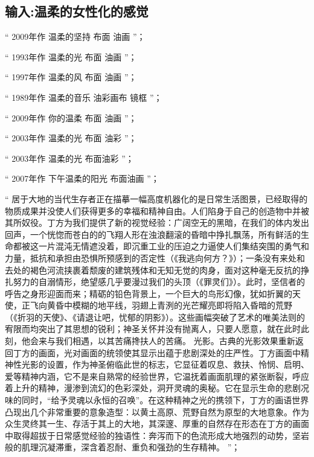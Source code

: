 \documentclass[master,oneside]{zjuthesis}
\begin{document}
\subsection{输入:温柔的女性化的感觉}
“ 2009年作 温柔的坚持 布面 油画 ”；

“ 1993年作 温柔的光 布面 油画 ”；

“ 1997年作 温柔的风 布面 油画 ”；

“ 1989年作 温柔的音乐 油彩画布 镜框 ”；

“ 2009年作 你的温柔 布面 油画 ”；

“ 2003年作 温柔的光 布面 油彩 ”；

“ 2003年作 温柔的光 布面油彩 ”；

“ 2007年作 下午温柔的阳光 布面油画 ”；

“ 居于大地的当代生存者正在描摹一幅高度机器化的是日常生活图景，已经取得的物质成果并没使人们获得更多的幸福和精神自由。人们陷身于自己的创造物中并被其所奴役。丁方为我们提供了新的视觉经验：广阔空无的黑暗，在我们的体内发出回声，一个恍惚而苍白的的飞翔人形在浊浪翻滚的昏暗中挣扎飘荡，所有鲜活的生命都被这一片混沌无情遮没着，即沉重工业的压迫之力逼使人们集结突围的勇气和力量，抵抗和承担由恐惧所预感到的否定性（《我逃向何方？》）；一条没有来处和去处的褐色河流挟裹着颓废的建筑残体和无知无觉的肉身，面对这种毫无反抗的挣扎努力的自溺情形，绝望感几乎要漫过我们的头顶（《罪灵们》）。此时，坚信者的呼告之身形迎面而来；精砺的铅色背景上，一个巨大的鸟形幻像，犹如折翼的天使，正飞向黄昏中模糊的地平线，羽翅上青洌的光芒耀亮即将陷入昏暗的荒野（《折羽的天使》、《请退让吧，忧郁的阴影》）。这些画幅突破了艺术的唯美法则的宥限而均突出了其思想的锐利；神圣关怀并没有抛离人，只要人愿意，就在此时此刻，他会来与我们相遇，以其苦痛搀扶人的苦痛。 光影。古典的光影效果重新返回丁方的画面，光对画面的统领使其显示出蕴于悲剧深处的庄严性。丁方画面中精神性光影的设置，作为神圣俯临此世的标志，它显征着叹息、救扶、怜悯、启明、爱等精神内涵，它不是来自熟常的经验世界，它温抚着画面肌理的紧张断裂，呼应着上升的精神，漫渗到流幻的色彩深处，洞开灵魂的奥秘。它在显示生命的悲剧况味的同时，“给予灵魂以永恒的召唤”。在这种精神之光的携领下，丁方的画语世界凸现出几个非常重要的意象造型：以黄土高原、荒野自然为原型的大地意象。作为众生灵终其一生、存活于其上的大地，其深邃、厚重的自然存在形态在丁方的画面中取得超拔于日常感觉经验的独语性：奔泻而下的色流形成大地强烈的动势，坚岩般的肌理沉凝滞重，深含着忍耐、重负和强劲的生存精神。 ”；
\end{document}
